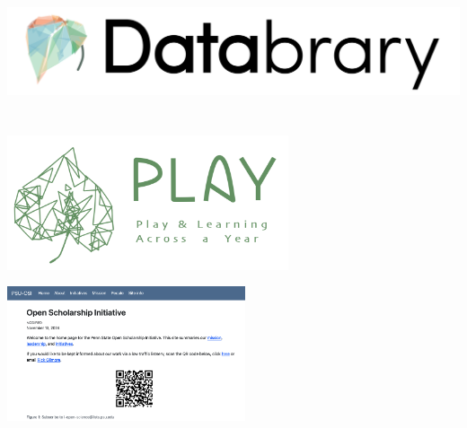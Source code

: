 \documentclass[
  letterpaper,
  DIV=11,
  numbers=noendperiod]{scrartcl}
\begin{document}
\begin{center}
\includegraphics[width=\linewidth,height=1.5625in,keepaspectratio]{../include/img/databrary-nav.png}
\end{center}
\begin{center}
\includegraphics[width=\linewidth,height=1.5625in,keepaspectratio]{img_gilmore_bio/PLAY-logo.png}
\end{center}
\begin{center}
\includegraphics[width=\linewidth,height=1.5625in,keepaspectratio]{img_gilmore_bio/psu-osi.png}
\end{center}
\end{document}
